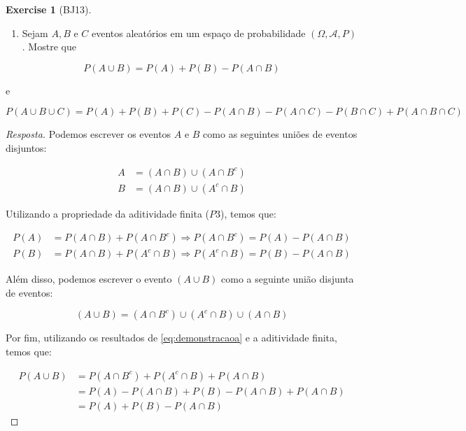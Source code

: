 \documentclass[
]{article}
\providecommand{\tightlist}{%
  \setlength{\itemsep}{0pt}\setlength{\parskip}{0pt}}
\theoremstyle{definition}
\theoremstyle{definition}
\theoremstyle{definition}
\newtheorem{exercise}{Exercise}[section]
\theoremstyle{definition}
\theoremstyle{remark}
\begin{document}
\begin{exercise}[BJ13]
\protect\hypertarget{exr:exbj13}{}\label{exr:exbj13}\leavevmode

\begin{enumerate}
\def\labelenumi{\alph{enumi})}
\tightlist
\item
  Sejam \(A, B \text{ e } C\) eventos aleatórios em um espaço de probabilidade \((\Omega,\mathcal{A},P)\). Mostre que
\end{enumerate}

\begin{equation*}
P(A \cup B) = P(A) + P(B) - P(A \cap B)
\end{equation*}

e

\begin{equation*}
P(A \cup B \cup C) = P(A) + P(B) + P(C) - P(A \cap B) - P(A \cap C) - P(B \cap C) + P(A \cap B \cap C)
\end{equation*}

\begin{proof}[Resposta]
Podemos escrever os eventos \(A\) e \(B\) como as seguintes uniões de eventos disjuntos:

\begin{align*}
A &= (A \cap B) \cup (A \cap B^{c}) \\
B &= (A \cap B) \cup (A^{c} \cap B)
\end{align*}

Utilizando a propriedade da aditividade finita (\(P3\)), temos que:

\begin{equation}
\begin{split}
P(A) &= P(A \cap B) + P(A \cap B^{c}) \Rightarrow P(A \cap B^{c}) = P(A) - P(A \cap B) \\
P(B) &= P(A \cap B) + P(A^{c} \cap B) \Rightarrow P(A^{c} \cap B) = P(B) - P(A \cap B)
\end{split}
\label{eq:demonstracaoa}
\end{equation}

Além disso, podemos escrever o evento \((A \cup B)\) como a seguinte união disjunta de eventos:

\begin{equation*}
(A \cup B) = (A \cap B^{c}) \cup (A^{c} \cap B) \cup (A \cap B)
\end{equation*}

Por fim, utilizando os resultados de \eqref{eq:demonstracaoa} e a aditividade finita, temos que:

\begin{align*}
P(A \cup B) &= P(A \cap B^{c}) + P(A^{c} \cap B) + P(A \cap B) \\
&= P(A) - P(A \cap B) + P(B) - P(A \cap B) + P(A \cap B) \\
&= P(A) + P(B) - P(A \cap B)
\end{align*}


\end{proof}
\end{exercise}
\end{document}
